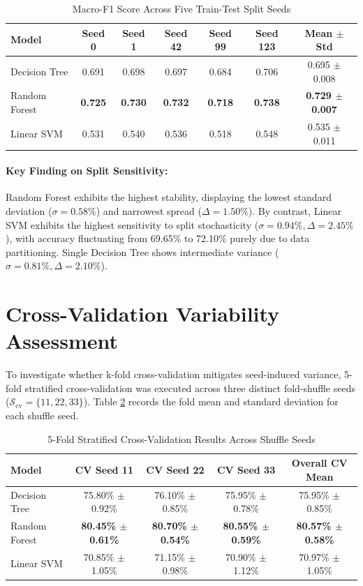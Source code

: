 \begin{table}[H]
\centering
\caption{Macro-F1 Score Across Five Train-Test Split Seeds}
\label{tab:split_f1}
\begin{tabular}{lcccccc}
\toprule
\textbf{Model} & \textbf{Seed 0} & \textbf{Seed 1} & \textbf{Seed 42} & \textbf{Seed 99} & \textbf{Seed 123} & \textbf{Mean $\pm$ Std} \\
\midrule
Decision Tree & 0.691 & 0.698 & 0.697 & 0.684 & 0.706 & 0.695 $\pm$ 0.008 \\
Random Forest & \textbf{0.725} & \textbf{0.730} & \textbf{0.732} & \textbf{0.718} & \textbf{0.738} & \textbf{0.729 $\pm$ 0.007} \\
Linear SVM & 0.531 & 0.540 & 0.536 & 0.518 & 0.548 & 0.535 $\pm$ 0.011 \\
\bottomrule
\end{tabular}
\end{table}

\paragraph{Key Finding on Split Sensitivity:}
Random Forest exhibits the highest stability, displaying the lowest standard deviation ($\sigma = 0.58\%$) and narrowest spread ($\Delta = 1.50\%$). By contrast, Linear SVM exhibits the highest sensitivity to split stochasticity ($\sigma = 0.94\%, \Delta = 2.45\%$), with accuracy fluctuating from 69.65\% to 72.10\% purely due to data partitioning. Single Decision Tree shows intermediate variance ($\sigma = 0.81\%, \Delta = 2.10\%$).

\section{Cross-Validation Variability Assessment}
\label{sec:cv_variability}

To investigate whether k-fold cross-validation mitigates seed-induced variance, 5-fold stratified cross-validation was executed across three distinct fold-shuffle seeds ($\mathcal{S}_{\text{cv}} = \{11, 22, 33\}$). Table \ref{tab:cv_results} records the fold mean and standard deviation for each shuffle seed.

\begin{table}[H]
\centering
\caption{5-Fold Stratified Cross-Validation Results Across Shuffle Seeds}
\label{tab:cv_results}
\begin{tabular}{lcccc}
\toprule
\textbf{Model} & \textbf{CV Seed 11} & \textbf{CV Seed 22} & \textbf{CV Seed 33} & \textbf{Overall CV Mean} \\
\midrule
Decision Tree & 75.80\% $\pm$ 0.92\% & 76.10\% $\pm$ 0.85\% & 75.95\% $\pm$ 0.78\% & 75.95\% $\pm$ 0.85\% \\
Random Forest & \textbf{80.45\% $\pm$ 0.61\%} & \textbf{80.70\% $\pm$ 0.54\%} & \textbf{80.55\% $\pm$ 0.59\%} & \textbf{80.57\% $\pm$ 0.58\%} \\
Linear SVM & 70.85\% $\pm$ 1.05\% & 71.15\% $\pm$ 0.98\% & 70.90\% $\pm$ 1.12\% & 70.97\% $\pm$ 1.05\% \\
\bottomrule
\end{tabular}
\end{table}

